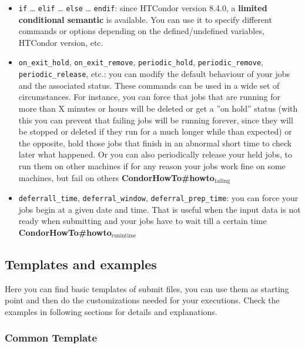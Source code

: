 \documentclass[a4paper,10pt]{article}
\begin{document}
\begin{itemize}
\begin{itemize}
\begin{itemize}
\item \texttt{if} \ldots{} \texttt{elif} \ldots{} \texttt{else} \ldots{}  \texttt{endif}: since HTCondor version 8.4.0, a
\textbf{limited conditional semantic} is available. You can use it to specify
different commands or options depending on the defined/undefined
variables, HTCondor version, etc.
\item \texttt{on\_exit\_hold}, \texttt{on\_exit\_remove}, \texttt{periodic\_hold}, \texttt{periodic\_remove},
\texttt{periodic\_release}, etc.: you can modify the default behaviour of your
jobs and the associated status. These commands can be used in a wide set
of circumstances. For instance, you can force that jobs that are running
for more than X minutes or hours will be deleted or get a ''on hold''
status (with this you can prevent that failing jobs will be running
forever, since they will be stopped or deleted if they run for a much
longer while than expected) or the opposite, hold those jobs that finish
in an abnormal short time to check later what happened. Or you can also
periodically release your held jobs, to run them on other machines if for
any reason your jobs work fine on some machines, but fail on others
\textbf{CondorHowTo\#howto\(_{\text{failing}}\)}
\item \texttt{deferrall\_time}, \texttt{deferral\_window}, \texttt{deferral\_prep\_time}: you can force
your jobs begin at a given date and time. That is useful when the input
data is not ready when submitting and your jobs have to wait till a
certain time \textbf{CondorHowTo\#howto\(_{\text{runintime}}\)}
\end{itemize}
\end{itemize}
\end{itemize}



\subsection{Templates and examples}
\label{sec:org2760f33}

Here you can find basic templates of submit files, you can use them as starting
point and then do the customizations needed for your executions. Check the
examples in following sections for details and explanations.

\subsubsection{Common Template}
\label{sec:org560dfb2}
\end{document}
